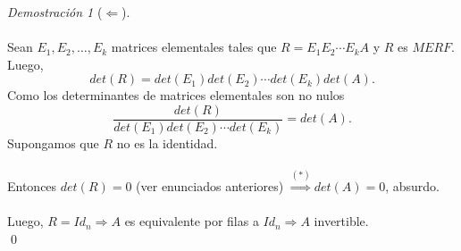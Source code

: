 \documentclass{article}
\theoremstyle{definition}
\theoremstyle{definition}
\theoremstyle{remark}
\newtheorem*{demo}{Demostración}
\begin{document}
\begin{demo}[$\Leftarrow$]\;\\\\
Sean $E_1,E_2, \dots ,E_k$ matrices elementales tales que $R=E_1E_2 \cdots E_k A$ y $R$ es $MERF$. Luego, \[
det(R)=det(E_1)det(E_2)\cdots det(E_k) det(A).
\]
Como los determinantes de matrices elementales son no nulos \begin{equation}\tag{*}
\frac{det(R)}{det(E_1)det(E_2)\cdots det(E_k)}=det(A).
\end{equation}
Supongamos que $R$ no es la identidad. \\\\
Entonces $det(R)=0$ (ver enunciados anteriores) $\overset{(*)}{\Rightarrow} det(A)=0$, absurdo. \\\\
Luego, $R=Id_n \Rightarrow A$ es equivalente por filas a $Id_n \Rightarrow A$ invertible. \\ \qed
\end{demo}
\pagebreak
\end{document}
